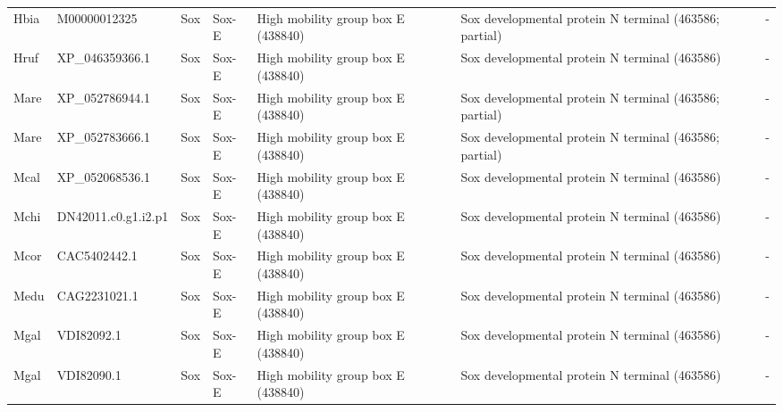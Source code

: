 \documentclass[../main.tex]{subfiles}
\begin{document}
\begin{landscape}
\begin{longtable}{lllllll}
		Hbia           & M00000012325          & Sox            & Sox-E               & High mobility group box E (438840)          & Sox developmental protein N terminal (463586; partial)                 & -                    \\
		Hruf           & XP\_046359366.1       & Sox            & Sox-E               & High mobility group box E (438840)          & Sox developmental protein N terminal (463586)                          & -                    \\
		Mare           & XP\_052786944.1       & Sox            & Sox-E               & High mobility group box E (438840)          & Sox developmental protein N terminal (463586; partial)                 & -                    \\
		Mare           & XP\_052783666.1       & Sox            & Sox-E               & High mobility group box E (438840)          & Sox developmental protein N terminal (463586; partial)                 & -                    \\
		Mcal           & XP\_052068536.1       & Sox            & Sox-E               & High mobility group box E (438840)          & Sox developmental protein N terminal (463586)                          & -                    \\
		Mchi           & DN42011.c0.g1.i2.p1   & Sox            & Sox-E               & High mobility group box E (438840)          & Sox developmental protein N terminal (463586)                          & -                    \\
		Mcor           & CAC5402442.1          & Sox            & Sox-E               & High mobility group box E (438840)          & Sox developmental protein N terminal (463586)                          & -                    \\
		Medu           & CAG2231021.1          & Sox            & Sox-E               & High mobility group box E (438840)          & Sox developmental protein N terminal (463586)                          & -                    \\
		Mgal           & VDI82092.1            & Sox            & Sox-E               & High mobility group box E (438840)          & Sox developmental protein N terminal (463586)                          & -                    \\
		Mgal           & VDI82090.1            & Sox            & Sox-E               & High mobility group box E (438840)          & Sox developmental protein N terminal (463586)                          & -                    \\

\end{longtable}
\end{landscape}
\end{document}
